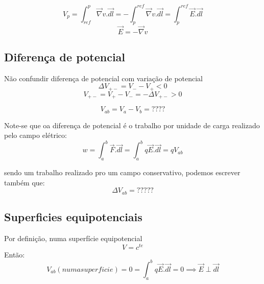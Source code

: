 \documentclass[a4paper]{article}
\begin{document}
\[V_p = \int_{ref}^{p}\vec{\nabla}v.\vec{dl}= -\int_{p}^{ref}\vec{\nabla}v.\vec{dl}= \int_{p}^{ref}\vec{E}.\vec{dl}\]
\[\vec{E} = -\vec{\nabla}v\]

\subsection{Diferença de potencial}
Não confundir diferença de potencial com variação de potencial
\[\Delta V_{+-} = V_- - V_+ < 0\]
\[V_{+-} = V_+ - V_-  = -\Delta V_{+-} > 0\]

\[V_{ab}=V_a - V_b = ????\]

Note-se que oa diferença de potencial é o trabalho por unidade de carga realizado pelo campo elétrico:
\[w= \int_{a}^{b}\vec{F}.\vec{dl}= \int_{a}^{b}q\vec{E}.\vec{dl}=qV_{ab}\]

sendo um trabalho realizado pro um campo conservativo, podemos escrever também que:
\[\Delta V_{ab}= ????? \]

\subsection{Superficies equipotenciais}
Por definição, numa superfície equipotencial
\[V = c^{te}\]
Então:
\[V_{ab}(numa superficie) = 0 = \int_{a}^{b}q\vec{E}.\vec{dl} = 0 \implies \vec{E} \perp \vec{dl}\]
\end{document}
